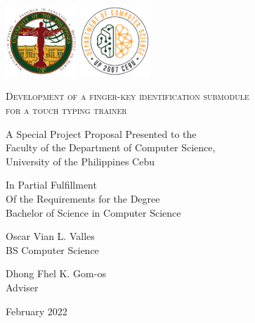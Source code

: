 \documentclass{report}
\begin{document}
\begin{titlepage}
	\centering

	\hspace{0pt}
	\vfill

	\includegraphics[width=0.2\textwidth]{upc.png}
	\includegraphics[width=0.2\textwidth]{dcs.png}
	\par\vspace{1cm}

	\textsc{Development of a finger-key identification submodule\\for a touch typing trainer}
	\par\vspace{0.5cm}

	\hrulefill{}
	\par\vspace{0.25cm}
	A Special Project Proposal Presented to the\\
	Faculty of the Department of Computer Science,\\
	University of the Philippines Cebu

	\par\vspace{0.25cm}
	In Partial Fulfillment\\
	Of the Requirements for the Degree\\
	Bachelor of Science in Computer Science\\
	\par\vspace{0.25cm}
	\hrulefill{}
	\par\vspace{0.5cm}

	Oscar Vian L. Valles\\
	BS Computer Science
	\par\vspace{0.5cm}

	Dhong Fhel K. Gom-os\\
	Adviser
	\par\vspace{0.5cm}

	February 2022
	\vfill
	\hspace{0pt}
\end{titlepage}
\end{document}
